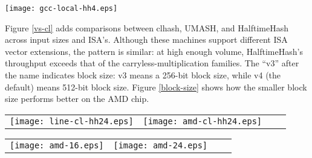 \documentclass[sigconf, nonacm]{acmart}
\begin{document}
\texttt{[image: gcc-local-hh4.eps]}

Figure \ref{vs-cl} adds comparisons between clhash, UMASH, and HalftimeHash across input sizes and ISA's.
Although these machines support different ISA vector extensions, the pattern is similar: at high enough volume, HalftimeHash's throughput exceeds that of the carryless-multiplication families.
The ``v3'' after the name indicates block size: v3 means a 256-bit block size, while v4 (the default) means 512-bit block size.
Figure \ref{block-size} shows how the smaller block size performs better on the AMD chip.

\begin{figure*}
\begin{tabular}{cccc}
\texttt{[image: line-cl-hh24.eps]}
&
\texttt{[image: amd-cl-hh24.eps]}
\end{tabular}
\caption{
  \label{vs-cl}
  Comparison of Intel (i7-7800x) and AMD (EC2 c5a.large, 7R32 chip) performance.
  These AMD chips do not support AVX-512, but still HalftimeHash with 256-bit registers exceeds the speed of clmul-based hashing methods by up to a factor of 2 on long strings.
  In both cases, for long strings, HalftimeHash with 24 bytes of output is faster than clhash and UMASH.
  HalftimeHash24 also has lower collision probability.
  For long strings, the incremental cost of hashing the 24 bytes down to 8 with tabulation hashing is insignificant.
}
\end{figure*}

\begin{figure*}
\begin{tabular}{cccc}
\texttt{[image: amd-16.eps]}
&
\texttt{[image: amd-24.eps]}
\end{tabular}
\caption{
  \label{block-size}
  AMD performance.
  AMD chips do not have AVX-512 instructions, so blocks of that size are simulated with 2 AVX2 registers.
  Using a block size of 256 bits performs better.}
\end{figure*}
\end{document}

